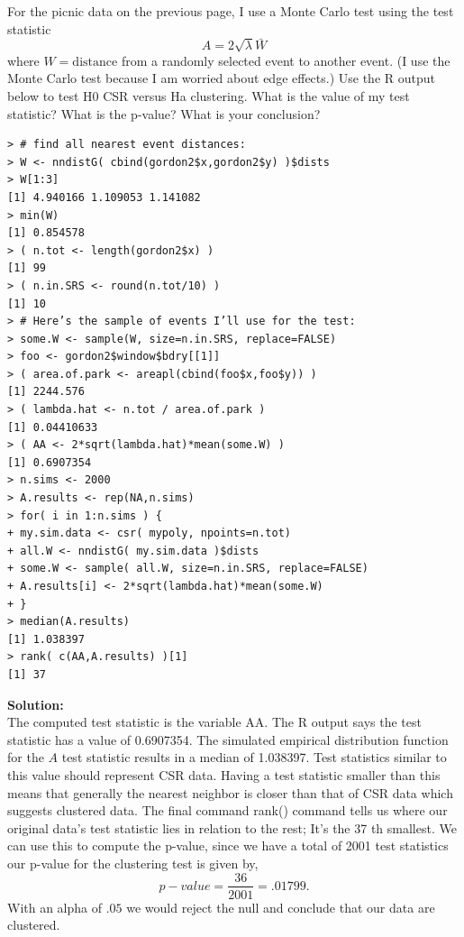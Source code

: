 \documentclass[12pt]{article}
\makeatletter
\theoremstyle{homework}
\newenvironment{exercise}[1]
{\def\@currentlabel{#1}\exercisecore}
{\endexercisecore}
\newcommand{\localhead}[1]{\par\smallskip\noindent\textbf{#1}\nobreak\\}%
\newcommand\solution{\localhead{Solution:}}
\makeatother
\begin{document}
\begin{exercise}{6} For the picnic data on the previous page, I use a Monte Carlo test using the
  test statistic
  \begin{equation*}
    A = 2\sqrt{\lambda} \bar{W}
  \end{equation*}
  where $W = \text{distance}$ from a randomly selected event to another event.
(I use the Monte Carlo test because I am worried about edge effects.)
Use the R output below to test H0\: CSR versus Ha\: clustering. What is the
value of my test statistic? What is the p-value? What is your conclusion?




\begin{footnotesize}
\begin{verbatim}
> # find all nearest event distances:
> W <- nndistG( cbind(gordon2$x,gordon2$y) )$dists
> W[1:3]
[1] 4.940166 1.109053 1.141082
> min(W)
[1] 0.854578
> ( n.tot <- length(gordon2$x) )
[1] 99
> ( n.in.SRS <- round(n.tot/10) )
[1] 10
> # Here’s the sample of events I’ll use for the test:
> some.W <- sample(W, size=n.in.SRS, replace=FALSE)
> foo <- gordon2$window$bdry[[1]]
> ( area.of.park <- areapl(cbind(foo$x,foo$y)) )
[1] 2244.576
> ( lambda.hat <- n.tot / area.of.park )
[1] 0.04410633
> ( AA <- 2*sqrt(lambda.hat)*mean(some.W) )
[1] 0.6907354
> n.sims <- 2000
> A.results <- rep(NA,n.sims)
> for( i in 1:n.sims ) {
+ my.sim.data <- csr( mypoly, npoints=n.tot)
+ all.W <- nndistG( my.sim.data )$dists
+ some.W <- sample( all.W, size=n.in.SRS, replace=FALSE)
+ A.results[i] <- 2*sqrt(lambda.hat)*mean(some.W)
+ }
> median(A.results)
[1] 1.038397
> rank( c(AA,A.results) )[1]
[1] 37
\end{verbatim}
\end{footnotesize}

\solution The computed test statistic is the variable AA. The R output says the test statistic has a value of 0.6907354. 
The simulated empirical distribution function for the $A$ test statistic results in a median of 1.038397. Test statistics similar to this 
value should represent CSR data. Having a test statistic smaller than this means that generally the nearest neighbor is closer than that of CSR data which 
suggests clustered data. The final command rank() command tells us where our original data's test statistic lies in relation to the rest; It's the 37 th smallest. 
We can use this to compute the p-value, since we have a total of 2001 test statistics our p-value for the clustering test is given by, 
\begin{equation*}
  p-value = \dfrac{36}{2001} = .01799.
\end{equation*}
With an alpha of $.05$ we would reject the null and conclude that our data are clustered.   
\end{exercise}
\vspace{.15in}
\end{document}
